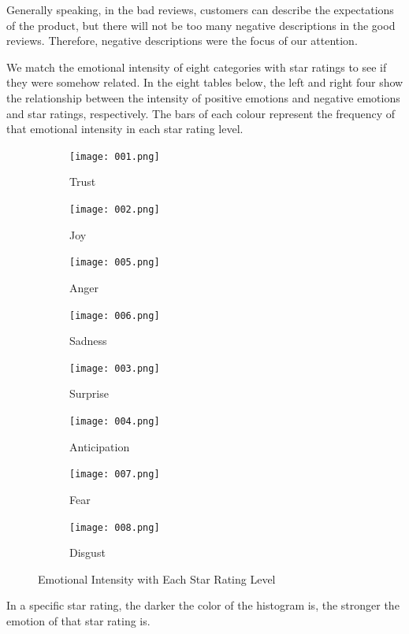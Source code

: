 \documentclass[12pt]{article}  %
\begin{document}
Generally speaking, in the bad reviews, customers can describe the expectations of the product, but there will not be too many negative descriptions in the good reviews. Therefore, negative descriptions were the focus of our attention.

We match the emotional intensity of eight categories with star ratings to see if they were somehow related. In the eight tables below, the left and right four show the relationship between the intensity of positive emotions and negative emotions and star ratings, respectively. The bars of each colour represent the frequency of that emotional intensity in each star rating level.

\begin{figure}[!h]
	\centering
	\begin{subfigure}[b]{.24\textwidth}
		\centering
		\texttt{[image: 001.png]}
		\caption{Trust}
	\end{subfigure}
	\begin{subfigure}[b]{.24\textwidth}
		\centering
		\texttt{[image: 002.png]}
		\caption{Joy}
	\end{subfigure}	
	\begin{subfigure}[b]{.24\textwidth}
		\centering
		\texttt{[image: 005.png]}
		\caption{Anger}
	\end{subfigure}	
	\begin{subfigure}[b]{.24\textwidth}
		\centering
		\texttt{[image: 006.png]}
		\caption{Sadness}
	\end{subfigure}	
	\begin{subfigure}[b]{.24\textwidth}
		\centering
		\texttt{[image: 003.png]}
		\caption{Surprise}
	\end{subfigure}
	\begin{subfigure}[b]{.24\textwidth}
		\centering
		\texttt{[image: 004.png]}
		\caption{Anticipation}
	\end{subfigure}	
	\begin{subfigure}[b]{.24\textwidth}
		\centering
		\texttt{[image: 007.png]}
		\caption{Fear}
	\end{subfigure}	
	\begin{subfigure}[b]{.24\textwidth}
		\centering
		\texttt{[image: 008.png]}
		\caption{Disgust}
	\end{subfigure}		
	\caption{Emotional Intensity with Each Star Rating Level}
	\label{fig:logo}
\end{figure}

In a specific star rating, the darker the color of the histogram is, the stronger the emotion of that star rating is. 
\end{document}
